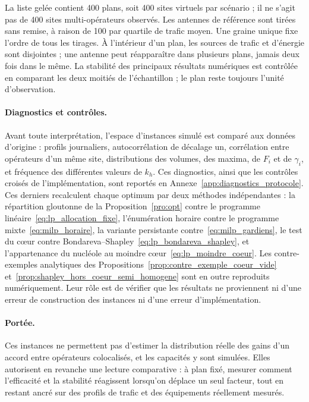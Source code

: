 La liste gelée contient 400 plans, soit 400 sites virtuels par scénario ; il
ne s'agit pas de 400 sites multi-opérateurs observés. Les antennes de
référence sont tirées sans remise, à raison de 100 par quartile de trafic
moyen. Une graine unique fixe
l'ordre de tous les tirages. À
l'intérieur d'un plan, les sources de trafic et d'énergie sont disjointes ;
une antenne peut réapparaître dans plusieurs plans, jamais deux fois dans le
même. La stabilité des principaux résultats numériques est contrôlée en
comparant les deux moitiés de l'échantillon ; le plan reste toujours l'unité
d'observation.

\paragraph{Diagnostics et contrôles.}
Avant toute interprétation, l'espace d'instances simulé est comparé aux
données d'origine : profils journaliers, autocorrélation de décalage un,
corrélation entre opérateurs d'un même site, distributions des volumes, des
maxima, de \(F_i\) et de \(\gamma_i\), et fréquence des différentes valeurs de
\(k_h\). Ces diagnostics, ainsi que les contrôles croisés de l'implémentation,
sont reportés en Annexe~\ref{app:diagnostics_protocole}. Ces derniers
recalculent chaque optimum par deux méthodes indépendantes : la répartition
gloutonne de la Proposition~\ref{pro:opt} contre le programme
linéaire~\eqref{eq:lp_allocation_fixe}, l'énumération horaire contre le
programme mixte~\eqref{eq:milp_horaire}, la variante persistante
contre~\eqref{eq:milp_gardiens}, le test du cœur contre
Bondareva--Shapley~\eqref{eq:lp_bondareva_shapley}, et l'appartenance du
nucléole au moindre cœur~\eqref{eq:lp_moindre_coeur}. Les contre-exemples
analytiques des Propositions~\ref{prop:contre_exemple_coeur_vide}
et~\ref{prop:shapley_hors_coeur_semi_homogene} sont en outre reproduits
numériquement. Leur rôle est de vérifier que les résultats ne proviennent ni
d'une erreur de construction des instances ni d'une erreur d'implémentation.

\paragraph{Portée.}
Ces instances ne permettent pas d'estimer la distribution réelle des gains
d'un accord entre opérateurs colocalisés, et les capacités y sont
simulées. Elles autorisent en revanche une lecture comparative : à
plan fixé, mesurer comment l'efficacité et la stabilité réagissent lorsqu'on
déplace un seul facteur, tout en restant ancré sur des profils de trafic et
des équipements réellement mesurés.

